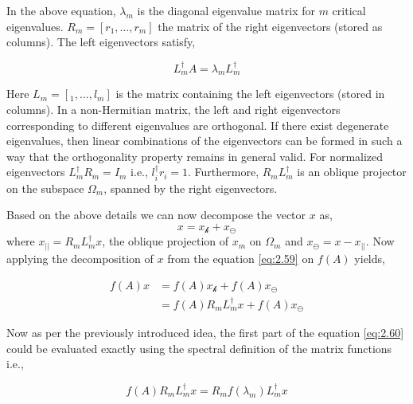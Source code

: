 In the above equation, $\lambda_{m}$ is the diagonal eigenvalue matrix for $m$ critical eigenvalues. $R_{m} = [r_{1},\dots,r_{m}]$ the matrix of the right eigenvectors (stored as columns). The left eigenvectors satisfy,

\begin{equation}
    L_{m}^{\dagger}A = \lambda_{m}L_{m}^{\dagger}
    \label{eq:2.58}
\end{equation}

Here $L_{m} = [_{1},\dots,l_{m}]$ is the matrix containing the left eigenvectors (stored in columns). In a non-Hermitian matrix, the left and right eigenvectors corresponding to different eigenvalues are orthogonal. If there exist degenerate eigenvalues, then linear combinations of the eigenvectors can be formed in such a way that the orthogonality property remains in general valid. For normalized eigenvectors $L_{m}^{\dagger}R_{m}=I_{m}$ i.e., $l_{i}^{\dagger}r_{i}=1$. Furthermore, $R_{m}L_{m}^{\dagger}$ is an oblique projector on the subspace $\Omega_{m}$, spanned by the right eigenvectors.

Based on the above details we can now decompose the vector $x$ as,
\begin{equation}
    x = x_{\mathcal{k}} + x_{\ominus}
    \label{eq:2.59}
\end{equation}
where $x_{||} = R_{m}L_{m}^{\dagger}x$, the oblique projection of $x_{m}$ on $\Omega_{m}$ and $x_{\ominus} = x - x_{||}$. Now applying the decomposition of $x$ from the equation \ref{eq:2.59} on $f(A)$ yields,

\begin{equation}
\begin{aligned}
    f(A)x &= f(A)x_{\mathcal{k}} + f(A)x_{\ominus} \\
          &= f(A)R_{m}L_{m}^{\dagger}x + f(A)x_{\ominus}
\end{aligned}
\label{eq:2.60}
\end{equation}

Now as per the previously introduced idea, the first part of the equation \ref{eq:2.60} could be evaluated exactly using the spectral definition of the matrix functions i.e.,

\begin{equation}
    f(A)R_{m}L_{m}^{\dagger}x = R_{m}f(\lambda_{m})L_{m}^{\dagger}x
    \label{eq:2.61}
\end{equation}

